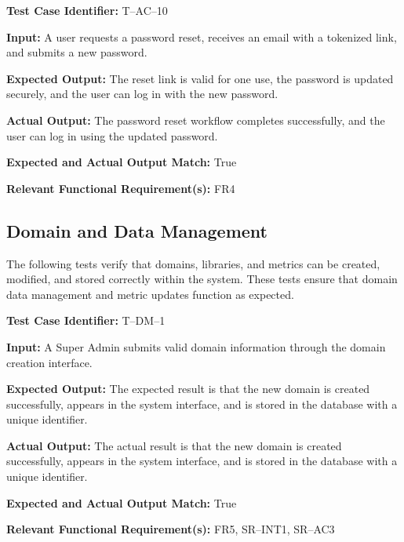 \documentclass[12pt, titlepage]{article}
\begin{document}
\begin{mdframed}[linewidth=0.5mm]
\setlength{\parindent}{0pt}
\textbf{Test Case Identifier:} T--AC--10
\vspace{0.4em}

\textbf{Input:} A user requests a password reset, receives an email with a tokenized link, and submits a new password.
\vspace{0.4em}

\textbf{Expected Output:} The reset link is valid for one use, the password is updated securely, and the user can log in with the new password.
\vspace{0.4em}

\textbf{Actual Output:} The password reset workflow completes successfully, and the user can log in using the updated password.
\vspace{0.4em}

\textbf{Expected and Actual Output Match:} True
\vspace{0.4em}

\textbf{Relevant Functional Requirement(s):} FR4
\end{mdframed}

\subsection{Domain and Data Management}

\hspace{2em}The following tests verify that domains, libraries, and metrics
can be created, modified, and stored correctly within the system. These
tests ensure that domain data management and metric updates function as
expected.

\begin{mdframed}[linewidth=0.5mm]
\setlength{\parindent}{0pt}
\textbf{Test Case Identifier:} T--DM--1
\vspace{0.4em}

\textbf{Input:} A Super Admin submits valid domain information through the domain creation interface.
\vspace{0.4em}

\textbf{Expected Output:} The expected result is that the new domain is created successfully, appears in the system interface, and is stored in the database with a unique identifier.
\vspace{0.4em}

\textbf{Actual Output:} The actual result is that the new domain is created successfully, appears in the system interface, and is stored in the database with a unique identifier.
\vspace{0.4em}

\textbf{Expected and Actual Output Match:} True
\vspace{0.4em}

\textbf{Relevant Functional Requirement(s):} FR5, SR--INT1, SR--AC3
\end{mdframed}
\end{document}
